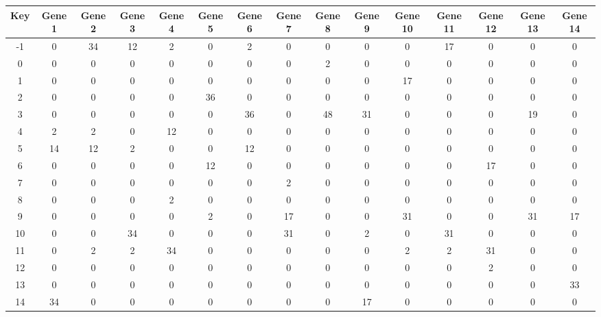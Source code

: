 \begin{tabular}{|c|c|c|c|c|c|c|c|c|c|c|c|c|c|c|}
\hline
Key & Gene 1 & Gene 2 & Gene 3 & Gene 4 & Gene 5 & Gene 6 & Gene 7 & Gene 8 & Gene 9 & Gene 10 & Gene 11 & Gene 12 & Gene 13 & Gene 14 \\
\hline
-1 & 0 & 34 & 12 & 2 & 0 & 2 & 0 & 0 & 0 & 0 & 17 & 0 & 0 & 0 \\
0 & 0 & 0 & 0 & 0 & 0 & 0 & 0 & 2 & 0 & 0 & 0 & 0 & 0 & 0 \\
1 & 0 & 0 & 0 & 0 & 0 & 0 & 0 & 0 & 0 & 17 & 0 & 0 & 0 & 0 \\
2 & 0 & 0 & 0 & 0 & 36 & 0 & 0 & 0 & 0 & 0 & 0 & 0 & 0 & 0 \\
3 & 0 & 0 & 0 & 0 & 0 & 36 & 0 & 48 & 31 & 0 & 0 & 0 & 19 & 0 \\
4 & 2 & 2 & 0 & 12 & 0 & 0 & 0 & 0 & 0 & 0 & 0 & 0 & 0 & 0 \\
5 & 14 & 12 & 2 & 0 & 0 & 12 & 0 & 0 & 0 & 0 & 0 & 0 & 0 & 0 \\
6 & 0 & 0 & 0 & 0 & 12 & 0 & 0 & 0 & 0 & 0 & 0 & 17 & 0 & 0 \\
7 & 0 & 0 & 0 & 0 & 0 & 0 & 2 & 0 & 0 & 0 & 0 & 0 & 0 & 0 \\
8 & 0 & 0 & 0 & 2 & 0 & 0 & 0 & 0 & 0 & 0 & 0 & 0 & 0 & 0 \\
9 & 0 & 0 & 0 & 0 & 2 & 0 & 17 & 0 & 0 & 31 & 0 & 0 & 31 & 17 \\
10 & 0 & 0 & 34 & 0 & 0 & 0 & 31 & 0 & 2 & 0 & 31 & 0 & 0 & 0 \\
11 & 0 & 2 & 2 & 34 & 0 & 0 & 0 & 0 & 0 & 2 & 2 & 31 & 0 & 0 \\
12 & 0 & 0 & 0 & 0 & 0 & 0 & 0 & 0 & 0 & 0 & 0 & 2 & 0 & 0 \\
13 & 0 & 0 & 0 & 0 & 0 & 0 & 0 & 0 & 0 & 0 & 0 & 0 & 0 & 33 \\
14 & 34 & 0 & 0 & 0 & 0 & 0 & 0 & 0 & 17 & 0 & 0 & 0 & 0 & 0 \\
\hline
\end{tabular}